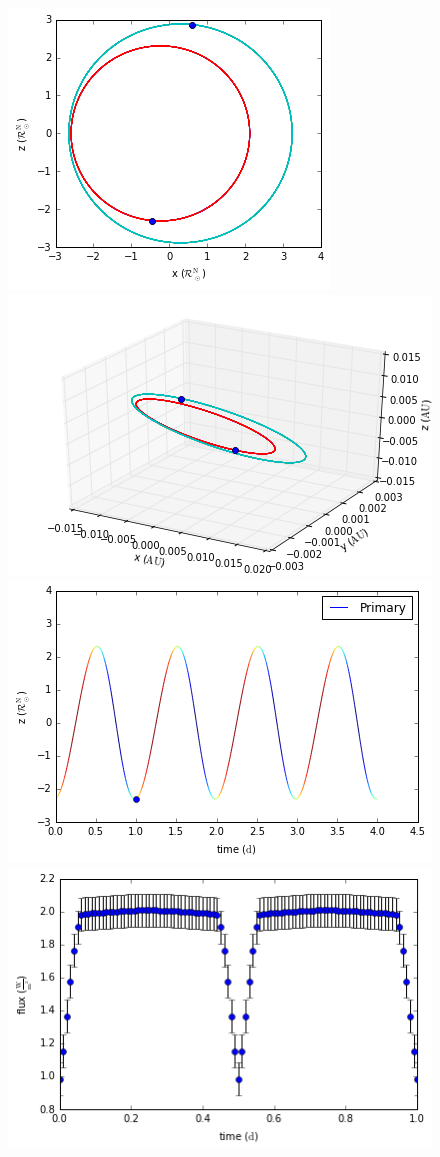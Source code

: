 \begin{figure}[tb]
\centering
\includegraphics[scale=0.5]{Phoebe1.png}
\includegraphics[scale=0.5]{Phoebe2.png}
\includegraphics[scale=0.5]{Phoebe3.png}
\includegraphics[scale=0.5]{Phoebe4.png}

\end{figure}
